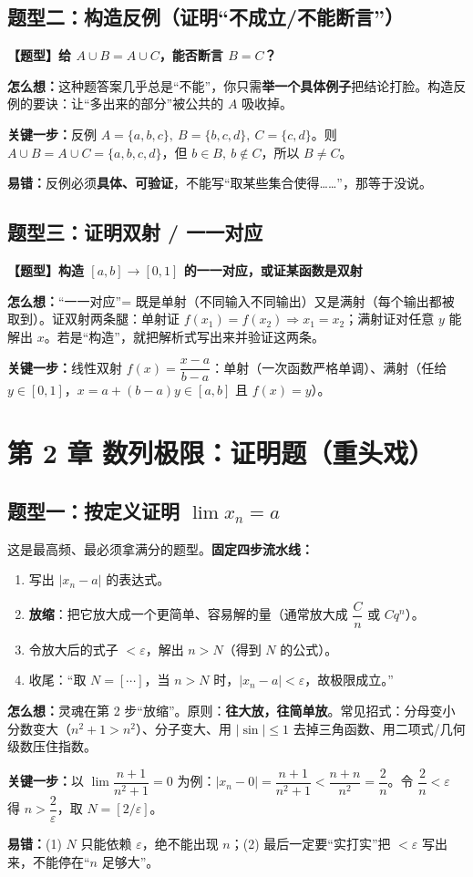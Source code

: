 ﻿\documentclass[11pt,a4paper,UTF8]{ctexart}
\newcommand{\eps}{\varepsilon}
\newcommand{\thm}[1]{\par\smallskip\noindent\colorbox{blue!8}{\textbf{【题型】#1}}\par\smallskip}
\newcommand{\think}[1]{\par\smallskip\noindent\textcolor{purple!75!black}{\textbf{怎么想：}#1}\par\smallskip}
\newcommand{\key}[1]{\par\smallskip\noindent\colorbox{yellow!22}{\textbf{关键一步：}#1}\par\smallskip}
\newcommand{\pit}[1]{\par\smallskip\noindent\textcolor{red!70!black}{\textbf{易错：}#1}\par\smallskip}
\begin{document}
\subsection{题型二：构造反例（证明“不成立/不能断言”）}

\thm{给 $A\cup B=A\cup C$，能否断言 $B=C$？}
\think{这种题答案几乎总是“不能”，你只需\textbf{举一个具体例子}把结论打脸。构造反例的要诀：让“多出来的部分”被公共的 $A$ 吸收掉。}
\key{反例 $A=\{a,b,c\},\ B=\{b,c,d\},\ C=\{c,d\}$。则 $A\cup B=A\cup C=\{a,b,c,d\}$，但 $b\in B,\ b\notin C$，所以 $B\ne C$。}
\pit{反例必须\textbf{具体、可验证}，不能写“取某些集合使得……”，那等于没说。}

\subsection{题型三：证明双射 / 一一对应}

\thm{构造 $[a,b]\to[0,1]$ 的一一对应，或证某函数是双射}
\think{“一一对应”= 既是单射（不同输入不同输出）又是满射（每个输出都被取到）。证双射两条腿：单射证 $f(x_1)=f(x_2)\Rightarrow x_1=x_2$；满射证对任意 $y$ 能解出 $x$。若是“构造”，就把解析式写出来并验证这两条。}
\key{线性双射 $f(x)=\dfrac{x-a}{b-a}$：单射（一次函数严格单调）、满射（任给 $y\in[0,1]$，$x=a+(b-a)y\in[a,b]$ 且 $f(x)=y$）。}

\section{第 2 章 数列极限：证明题（重头戏）}

\subsection{题型一：按定义证明 $\lim x_n=a$}

这是最高频、最必须拿满分的题型。\textbf{固定四步流水线：}
\begin{enumerate}[leftmargin=1.4em]
\item 写出 $|x_n-a|$ 的表达式。
\item \textbf{放缩}：把它放大成一个更简单、容易解的量（通常放大成 $\dfrac{C}{n}$ 或 $Cq^n$）。
\item 令放大后的式子 $<\eps$，解出 $n>N$（得到 $N$ 的公式）。
\item 收尾：“取 $N=[\cdots]$，当 $n>N$ 时，$|x_n-a|<\eps$，故极限成立。”
\end{enumerate}

\think{灵魂在第 2 步“放缩”。原则：\textbf{往大放，往简单放}。常见招式：分母变小分数变大（$n^2+1>n^2$）、分子变大、用 $|\sin|\le1$ 去掉三角函数、用二项式/几何级数压住指数。}
\key{以 $\lim\dfrac{n+1}{n^2+1}=0$ 为例：$|x_n-0|=\dfrac{n+1}{n^2+1}<\dfrac{n+n}{n^2}=\dfrac2n$。令 $\dfrac2n<\eps$ 得 $n>\dfrac2\eps$，取 $N=[2/\eps]$。}
\pit{(1) $N$ 只能依赖 $\eps$，绝不能出现 $n$；(2) 最后一定要“实打实”把 $< \eps$ 写出来，不能停在“$n$ 足够大”。}
\end{document}
